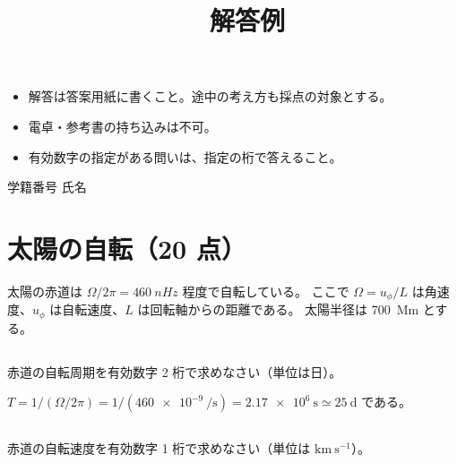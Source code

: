 \documentclass[a4j,12pt]{ltjarticle}
\title{\kamoku\ \shiken\ifshowanswer\ 解答例\fi}
\author{}
\date{\jisshibi}
\newif\ifshowanswer
\numberwithin{equation}{section}
\newcommand{\ansspace}[1]{\ifshowanswer\vspace{2mm}\else\vspace{#1}\fi}
\newcommand{\haiten}[1]{\texorpdfstring{\hfill\normalsize（#1 点）}{}}  %
\begin{document}
\maketitle
\thispagestyle{empty}

\ifshowanswer\else
\noindent
\begin{tcolorbox}[colback=black!3,colframe=black!40,left=6pt,right=6pt]
  \small
  \begin{itemize}[leftmargin=1.2em,itemsep=0pt,topsep=0pt]
    \item 解答は答案用紙に書くこと。途中の考え方も採点の対象とする。
    \item 電卓・参考書の持ち込みは不可。
    \item 有効数字の指定がある問いは、指定の桁で答えること。
  \end{itemize}
  \vspace{2mm}
  \normalsize
  学籍番号 \underline{\hspace{40mm}}\qquad 氏名 \underline{\hspace{50mm}}
\end{tcolorbox}
\vspace{5mm}
\fi


\section{太陽の自転\haiten{20}}

太陽の赤道は $\Omega/2\pi = \qty{460}{nHz}$ 程度で自転している。
ここで $\Omega = u_\phi/L$ は角速度、$u_\phi$ は自転速度、$L$ は回転軸からの距離である。
太陽半径は \qty{700}{Mm} とする。

\subsection{}
赤道の自転周期を有効数字 2 桁で求めなさい（単位は日）。

\ansspace{3cm}

\begin{kaitou}
  $T = 1/(\Omega/2\pi) = 1/(\qty{460e-9}{\per\second})
   = \qty{2.17e6}{\second} \simeq \qty{25}{\day}$ である。
\end{kaitou}

\subsection{}
赤道の自転速度を有効数字 1 桁で求めなさい（単位は $\mathrm{km~s^{-1}}$）。

\ansspace{3cm}
\end{document}
